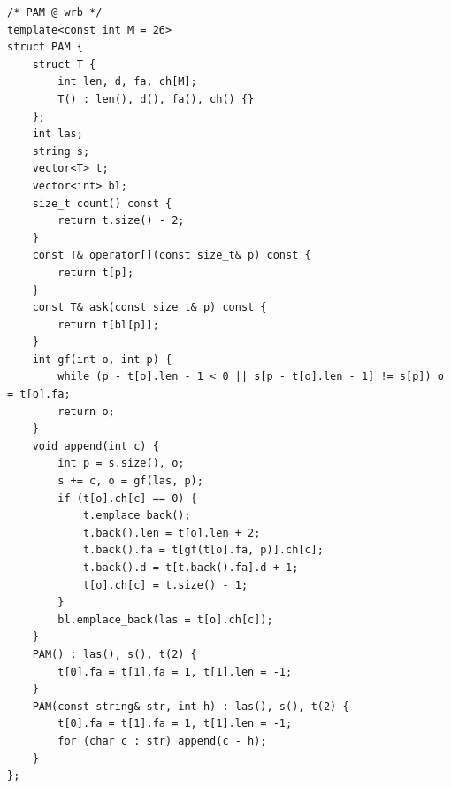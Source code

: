 \documentclass[UTF8, a4paper, titlepage, twoside]{ctexart}
\begin{document}
\begin{lstlisting}[style=cpp]
/* PAM @ wrb */
template<const int M = 26>
struct PAM {
    struct T {
        int len, d, fa, ch[M];
        T() : len(), d(), fa(), ch() {}
    };
    int las;
    string s;
    vector<T> t;
    vector<int> bl;
    size_t count() const {
        return t.size() - 2;
    }
    const T& operator[](const size_t& p) const {
        return t[p];
    }
    const T& ask(const size_t& p) const {
        return t[bl[p]];
    }
    int gf(int o, int p) {
        while (p - t[o].len - 1 < 0 || s[p - t[o].len - 1] != s[p]) o = t[o].fa;
        return o;
    }
    void append(int c) {
        int p = s.size(), o;
        s += c, o = gf(las, p);
        if (t[o].ch[c] == 0) {
            t.emplace_back();
            t.back().len = t[o].len + 2;
            t.back().fa = t[gf(t[o].fa, p)].ch[c];
            t.back().d = t[t.back().fa].d + 1;
            t[o].ch[c] = t.size() - 1;
        }
        bl.emplace_back(las = t[o].ch[c]);
    }
    PAM() : las(), s(), t(2) {
        t[0].fa = t[1].fa = 1, t[1].len = -1;
    }
    PAM(const string& str, int h) : las(), s(), t(2) {
        t[0].fa = t[1].fa = 1, t[1].len = -1;
        for (char c : str) append(c - h);
    }
};
\end{lstlisting}
\end{document}

